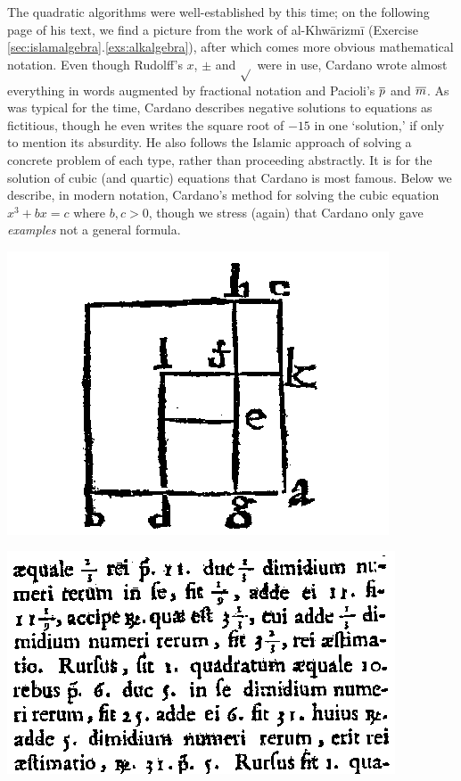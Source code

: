 \begin{minipage}[t]{0.65\linewidth}\vspace{0pt}
	The quadratic algorithms were well-established by this time; on the following page of his text, we find a picture from the work of al-Khwārizmī (Exercise \ref*{sec:islamalgebra}.\ref{exs:alkalgebra}), after which comes more obvious mathematical notation. Even though Rudolff's $x$, $\pm$ and $\sqrt{}$ were in use, Cardano wrote almost everything in words augmented by fractional notation and Pacioli's $\overline{p}$ and $\overline{m}$.\smallbreak
	As was typical for the time, Cardano describes negative solutions to equations as fictitious, though he even writes the square root of $-15$ in one `solution,' if only to mention its absurdity. He also follows the Islamic approach of solving a concrete problem of each type, rather than proceeding abstractly.\medbreak
	It is for the solution of cubic (and quartic) equations that Cardano is most famous. Below we describe, in modern notation, Cardano's method for solving the cubic equation $x^3+bx=c$ where $b,c>0$, though we stress (again) that Cardano only gave \emph{examples} not a general formula.
\end{minipage}
\hfill
\begin{minipage}[t]{0.32\linewidth}\vspace{-5pt}
	\flushright\includegraphics[width=\linewidth]{cardano3}\par
	\includegraphics[width=\linewidth]{cardano2}
\end{minipage}\par


